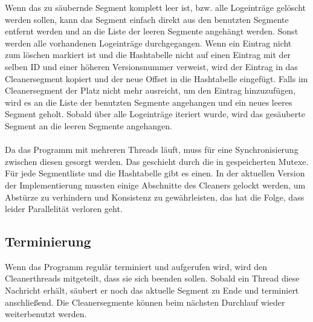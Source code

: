 \documentclass{class/thesis}
\begin{document}
\begin{thesis}
	Wenn das zu säubernde Segment komplett leer ist, bzw. alle Logeinträge gelöscht werden sollen, kann das Segment einfach direkt aus den benutzten Segmente entfernt werden und an die Liste der leeren Segmente angehängt werden.
	Sonst werden alle vorhandenen Logeinträge durchgegangen. Wenn ein Eintrag nicht zum löschen markiert ist und die Hashtabelle nicht auf einen Eintrag mit der selben ID und einer höheren Versionsnummer verweist, wird der Eintrag in das Cleanersegment kopiert und der neue Offset in die Hashtabelle eingefügt.
	Falls im Cleanersegment der Platz nicht mehr ausreicht, um den Eintrag hinzuzufügen, wird es an die Liste der benutzten Segmente angehangen und ein neues leeres Segment geholt.
	Sobald über alle Logeinträge iteriert wurde, wird das gesäuberte Segment an die leeren Segmente angehangen.
	\\
	\\
	Da das Programm mit mehreren Threads läuft, muss für eine Synchronisierung zwischen diesen gesorgt werden.
	Das geschieht durch die in  gespeicherten Mutexe. Für jede Segmentliste und die Hashtabelle gibt es einen. In der aktuellen Version der Implementierung mussten einige Abschnitte des Cleaners gelockt werden, um Abstürze zu verhindern und Konsistenz zu gewährleisten, das hat die Folge, dass leider Parallelität verloren geht.
	
	
	\subsection{Terminierung}
	Wenn das Programm regulär terminiert und  aufgerufen wird, wird den Cleanerthreads mitgeteilt, dass sie sich beenden sollen. Sobald ein Thread diese Nachricht erhält, säubert er noch das aktuelle Segment zu Ende und terminiert anschließend.
	Die Cleanersegmente können beim nächsten Durchlauf wieder weiterbenutzt werden.
	
	
	

\end{thesis}
\end{document}
